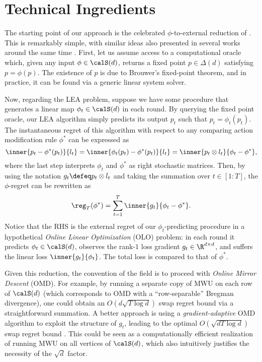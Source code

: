 \documentclass[10pt]{article}
\begin{document}
\section{Technical Ingredients}\label{section:ingredients}

The starting point of our approach is the celebrated $\phi$-to-external reduction of \cite{gordon2008no}. This is remarkably simple, with similar ideas also presented in several works around the same time \citep{stoltz2005internal,blum2007external}. First, let us assume access to a computational oracle which, given any input $\phi\in\calS(d)$, returns a fixed point $p\in\Delta(d)$ satisfying $p=\phi(p)$. The existence of $p$ is due to Brouwer's fixed-point theorem, and in practice, it can be found via a generic linear system solver. 

Now, regarding the LEA problem, suppose we have some procedure that generates a linear map $\phi_t\in\calS(d)$ in each round. By querying the fixed point oracle, our LEA algorithm simply predicts its output $p_t$ such that $p_t=\phi_t(p_t)$. The instantaneous regret of this algorithm with respect to any comparing action modification rule $\phi^*$ can be expressed as
\begin{equation*}
\inner{p_t-\phi^*(p_t)}{l_t}=\inner{\phi_t(p_t)-\phi^*(p_t)}{l_t}=\inner{p_t\otimes l_t}{\phi_t-\phi^*},
\end{equation*}
where the last step interprets $\phi_t$ and $\phi^*$ as right stochastic matrices. Then, by using the notation $g_t\defeq p_t\otimes l_t$ and taking the summation over $t\in[1:T]$, the $\phi$-regret can be rewritten as
\begin{equation}\label{eq:ggm}
\reg_T(\phi^*)=\sum_{t=1}^T\inner{g_t}{\phi_t-\phi^*}.
\end{equation}
Notice that the RHS is the external regret of our $\phi_t$-predicting procedure in a hypothetical \emph{Online Linear Optimization} (OLO) problem: in each round it predicts $\phi_t\in\calS(d)$, observes the rank-$1$ loss gradient $g_t\in\R^{d\times d}$, and suffers the linear loss $\inner{g_t}{\phi_t}$. The total loss is compared to that of $\phi^*$.

Given this reduction, the convention of the field is to proceed with \emph{Online Mirror Descent} (OMD). For example, by running a separate copy of MWU on each row of $\calS(d)$ (which corresponds to OMD with a ``row-separable'' Bregman divergence), one could obtain an $O(d\sqrt{T\log d})$ swap regret bound via a straightforward summation. A better approach is using a \emph{gradient-adaptive} OMD algorithm to exploit the structure of $g_t$, leading to the optimal $O(\sqrt{dT\log d})$ swap regret bound \citep{blum2007external}. This could be seen as a computationally efficient realization of running MWU on all vertices of $\calS(d)$, which also intuitively justifies the necessity of the $\sqrt{d}$ factor. 
\end{document}
